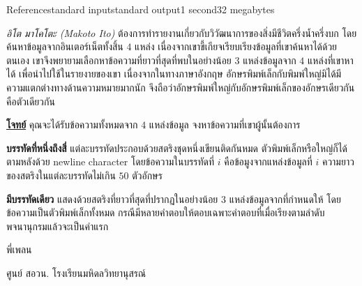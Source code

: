 \documentclass[11pt,a4paper]{article}
\begin{document}
\begin{problem}{Reference}{standard input}{standard output}{1 second}{32 megabytes}

  \textit{อิโต มาโคโตะ (Makoto Ito)} ต้องการทำรายงานเกี่ยวกับวิวัฒนาการของสิ่งมีชีวิตครึ่งน้ำครึ่งบก โดยค้นหาข้อมูลจากอินเตอร์เน็ตทั้งสิ้น $4$ แหล่ง เนื่องจากเขาขี้เกียจเรียบเรียงข้อมูลที่เขาค้นหาได้ด้วยตนเอง เขาจึงพยายามเลือกหาข้อความที่ยาวที่สุดที่พบในอย่างน้อย $3$ แหล่งข้อมูลจาก $4$ แหล่งที่เขาหาได้ เพื่อนำไปใช้ในรายงายของเขา เนื่องจากในทางภาษาอังกฤษ อักษรพิมพ์เล็กกับพิมพ์ใหญ่มิได้มีความแตกต่างทางด้านความหมายมากนัก จึงถือว่าอักษรพิมพ์ใหญ่กับอักษรพิมพ์เล็กของอักษรเดียวกันคือตัวเดียวกัน

          
\bigskip
\underline{\textbf{โจทย์}}  คุณจะได้รับข้อความทั้งหมดจาก $4$ แหล่งข้อมูล จงหาข้อความที่เขาผู้นั้นต้องการ


\InputFile

\textbf{บรรทัดที่หนึ่งถึงสี่} แต่ละบรรทัดประกอบด้วยสตริงชุดหนึ่งเขียนติดกันหมด ตัวพิมพ์เล็กหรือใหญ่ก็ได้ ตามหลังด้วย newline character โดยข้อความในบรรทัดที่ $i$ คือข้อมูงจากแหล่งข้อมูลที่ $i$ ความยาวของสตริงในแต่ละบรรทัดไม่เกิน $50$ ตัวอักษร

\OutputFile

\textbf{มีบรรทัดเดียว} แสดงด้วยสตริงที่ยาวที่สุดที่ปรากฏในอย่างน้อย $3$ แหล่งข้อมูลจากที่กำหนดให้ โดยข้อความเป็นตัวพิมพ์เล็กทั้งหมด กรณีมีหลายคำตอบให้ตอบเฉพาะคำตอบที่เมื่อเรียงตามลำดับพจนานุกรมแล้วจะเป็นคำแรก

\Examples

\begin{example}
%
\end{example}

\newpage

\Source

พี่เพลน

ศูนย์ สอวน. โรงเรียนมหิดลวิทยานุสรณ์

\end{problem}
\end{document}
